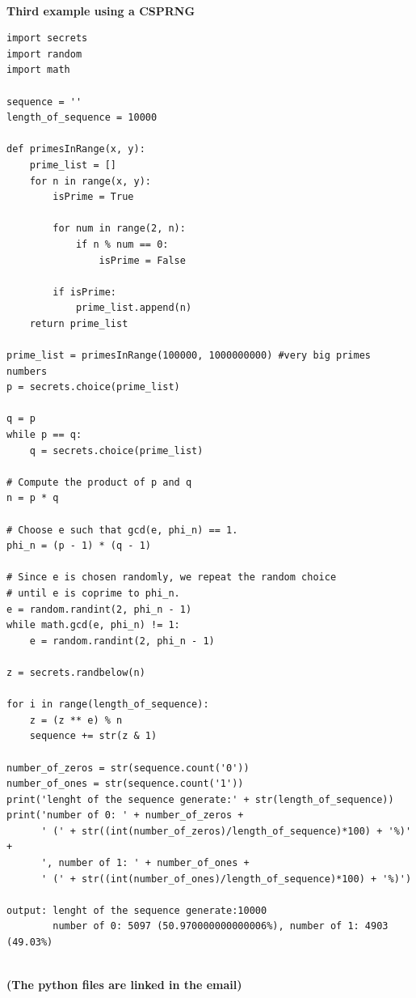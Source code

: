 \documentclass{article}
\begin{document}
\textbf{\\Third example using a CSPRNG}
\begin{lstlisting}
import secrets
import random
import math

sequence = ''
length_of_sequence = 10000

def primesInRange(x, y):
    prime_list = []
    for n in range(x, y):
        isPrime = True

        for num in range(2, n):
            if n % num == 0:
                isPrime = False

        if isPrime:
            prime_list.append(n)
    return prime_list

prime_list = primesInRange(100000, 1000000000) #very big primes numbers
p = secrets.choice(prime_list)

q = p
while p == q:
    q = secrets.choice(prime_list)

# Compute the product of p and q
n = p * q

# Choose e such that gcd(e, phi_n) == 1.
phi_n = (p - 1) * (q - 1)

# Since e is chosen randomly, we repeat the random choice
# until e is coprime to phi_n.
e = random.randint(2, phi_n - 1)
while math.gcd(e, phi_n) != 1:
    e = random.randint(2, phi_n - 1)

z = secrets.randbelow(n)

for i in range(length_of_sequence):
    z = (z ** e) % n
    sequence += str(z & 1)

number_of_zeros = str(sequence.count('0'))
number_of_ones = str(sequence.count('1'))
print('lenght of the sequence generate:' + str(length_of_sequence))
print('number of 0: ' + number_of_zeros + 
      ' (' + str((int(number_of_zeros)/length_of_sequence)*100) + '%)' +
      ', number of 1: ' + number_of_ones + 
      ' (' + str((int(number_of_ones)/length_of_sequence)*100) + '%)')
      
output: lenght of the sequence generate:10000
        number of 0: 5097 (50.970000000000006%), number of 1: 4903 (49.03%)
\end{lstlisting}
\textbf{\\(The python files are linked in the email)}
\end{document}
